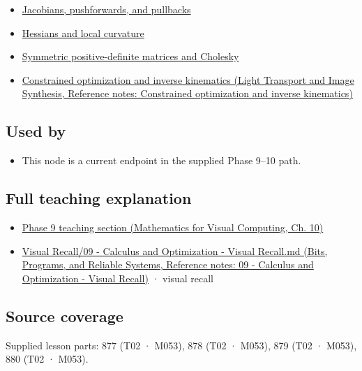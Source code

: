 \begin{itemize}
\tightlist
\item
  \hyperref[appendix-d8a7ddb675eb]{Jacobians, pushforwards, and pullbacks}
\item
  \hyperref[appendix-6ac071f8b50c]{Hessians and local curvature}
\item
  \hyperref[appendix-50d2ea3c9b26]{Symmetric positive-definite matrices and Cholesky}
\item
  \href{../04-Light-Transport-and-Image-Synthesis/main.pdf\#nameddest=appendix-29f4bea4c2bb}{Constrained optimization and inverse kinematics (Light Transport and Image Synthesis, Reference notes: Constrained optimization and inverse kinematics)}
\end{itemize}

\subsection{Used by}\label{appendix-2c2df8345991-used-by}

\hypertarget{appendix-2c2df8345991-used-by}{}

\begin{itemize}
\tightlist
\item
  This node is a current endpoint in the supplied Phase 9--10 path.
\end{itemize}

\subsection{Full teaching explanation}\label{appendix-2c2df8345991-full-teaching-explanation}

\hypertarget{appendix-2c2df8345991-full-teaching-explanation}{}

\begin{itemize}
\tightlist
\item
  \href{../02-Mathematics-for-Visual-Computing/main.pdf\#nameddest=02-foundations-ii-ch026-optimization-and-inverse-problems}{Phase 9 teaching section (Mathematics for Visual Computing, Ch. 10)}
\item
  \href{../01-Bits-Programs-and-Reliable-Systems/main.pdf\#nameddest=appendix-adf48f5dc5c1}{Visual Recall/09 - Calculus and Optimization - Visual Recall.md (Bits, Programs, and Reliable Systems, Reference notes: 09 - Calculus and Optimization - Visual Recall)} · visual recall
\end{itemize}

\subsection{Source coverage}\label{appendix-2c2df8345991-source-coverage}

\hypertarget{appendix-2c2df8345991-source-coverage}{}

Supplied lesson parts: 877 (T02 · M053), 878 (T02 · M053), 879 (T02 · M053), 880 (T02 · M053).
